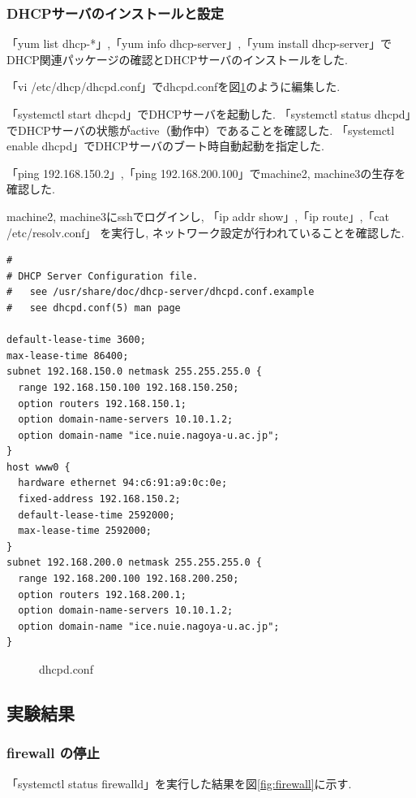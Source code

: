 \documentclass{ltjsarticle} %
\begin{document}
\subsubsection{DHCPサーバのインストールと設定}
「yum list dhcp-*」,「yum info dhcp-server」,「yum install dhcp-server」で
DHCP関連パッケージの確認とDHCPサーバのインストールをした. 

「vi /etc/dhcp/dhcpd.conf」でdhcpd.confを図\ref{fig:dhcpd_conf}のように編集した. 

「systemctl start dhcpd」でDHCPサーバを起動した. 
「systemctl status dhcpd」でDHCPサーバの状態がactive（動作中）であることを確認した. 
「systemctl enable dhcpd」でDHCPサーバのブート時自動起動を指定した. 

「ping 192.168.150.2」,「ping 192.168.200.100」でmachine2, machine3の生存を確認した. 

machine2, machine3にsshでログインし, 「ip addr show」,「ip route」,「cat /etc/resolv.conf」
を実行し, ネットワーク設定が行われていることを確認した. 

\begin{mdframed}
  \begin{verbatim}
#
# DHCP Server Configuration file.
#   see /usr/share/doc/dhcp-server/dhcpd.conf.example
#   see dhcpd.conf(5) man page

default-lease-time 3600;
max-lease-time 86400;
subnet 192.168.150.0 netmask 255.255.255.0 {
  range 192.168.150.100 192.168.150.250;
  option routers 192.168.150.1;
  option domain-name-servers 10.10.1.2;
  option domain-name "ice.nuie.nagoya-u.ac.jp";
}
host www0 {
  hardware ethernet 94:c6:91:a9:0c:0e;
  fixed-address 192.168.150.2;
  default-lease-time 2592000;
  max-lease-time 2592000;
}
subnet 192.168.200.0 netmask 255.255.255.0 {
  range 192.168.200.100 192.168.200.250;
  option routers 192.168.200.1;
  option domain-name-servers 10.10.1.2;
  option domain-name "ice.nuie.nagoya-u.ac.jp";
}
  \end{verbatim}
  \end{mdframed}
  \begin{figure}[H]
  \caption{dhcpd.conf}
  \label{fig:dhcpd_conf}
\end{figure}


\subsection{実験結果}

\subsubsection{firewall の停止}
「systemctl status firewalld」を実行した結果を図\ref{fig:firewall}に示す. 
\end{document}

